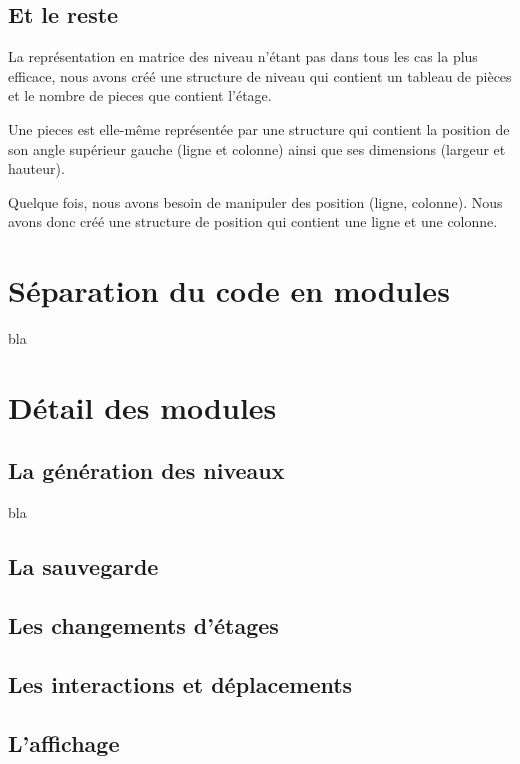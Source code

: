 \documentclass[12pt]{report}
\begin{document}
		\subsection{Et le reste}
		
		La représentation en matrice des niveau n'étant pas dans tous les cas la plus efficace, nous avons créé une structure de niveau qui contient un tableau de pièces et le nombre de pieces que contient l'étage.
		
		Une pieces est elle-même représentée par une structure qui contient la position de son angle supérieur gauche (ligne et colonne) ainsi que ses dimensions (largeur et hauteur).
		
		Quelque fois, nous avons besoin de manipuler des position (ligne, colonne). Nous avons donc créé une structure de position qui contient une ligne et une colonne. 
		
	\section{Séparation du code en modules}
	
	bla
	
	\section{Détail des modules}
	
		\subsection{La génération des niveaux}
		
		bla
		
		\subsection{La sauvegarde}
		
		\subsection{Les changements d'étages}
		
		\subsection{Les interactions et déplacements}
		
		\subsection{L'affichage}
		
\end{document}
